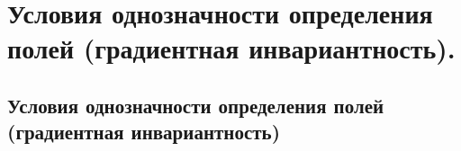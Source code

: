 \chapter{Условия однозначности определения полей (градиентная 
инвариантность).}

\section{Условия однозначности определения полей (градиентная 
инвариантность)}
